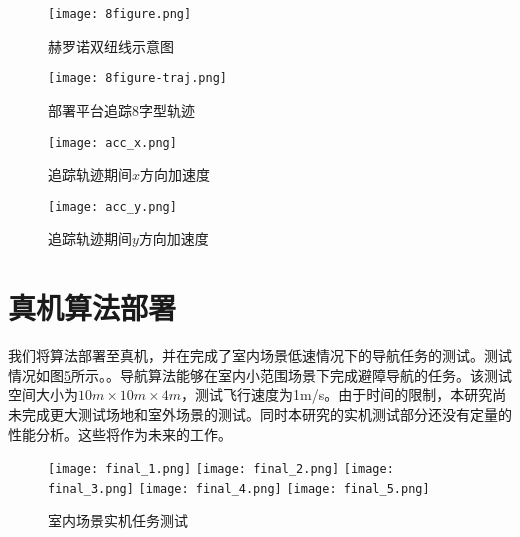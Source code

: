 \begin{figure}
    \centering
    \texttt{[image: 8figure.png]}
    \caption{赫罗诺双纽线示意图}
    \label{fig_8}
\end{figure}
\begin{figure}
    \centering
    \texttt{[image: 8figure-traj.png]}
    \caption{部署平台追踪8字型轨迹}
    \label{fig_8traj}
\end{figure}
\begin{figure}
    \centering
    \texttt{[image: acc\_x.png]}
    \caption{追踪轨迹期间$x$方向加速度}
    \label{fig_acc_x}
\end{figure}
\begin{figure}
    \centering
    \texttt{[image: acc\_y.png]}
    \caption{追踪轨迹期间$y$方向加速度}
    \label{fig_acc_y}
\end{figure}

\section{真机算法部署}

我们将算法部署至真机，并在完成了室内场景低速情况下的导航任务的测试。测试情况如图\ref{fig_realflight}所示。。导航算法能够在室内小范围场景下完成避障导航的任务。该测试空间大小为$10m\times 10m\times 4m$，测试飞行速度为1m/s。由于时间的限制，本研究尚未完成更大测试场地和室外场景的测试。同时本研究的实机测试部分还没有定量的性能分析。这些将作为未来的工作。
\begin{figure}
  \centering
  \subcaptionbox{}
    {\texttt{[image: final\_1.png]}}
  \subcaptionbox{}
    {\texttt{[image: final\_2.png]}}
    \subcaptionbox{}
    {\texttt{[image: final\_3.png]}}
    \subcaptionbox{}
    {\texttt{[image: final\_4.png]}}
    \subcaptionbox{}
    {\texttt{[image: final\_5.png]}}
  \caption{室内场景实机任务测试}
  \label{fig_realflight}
\end{figure}


